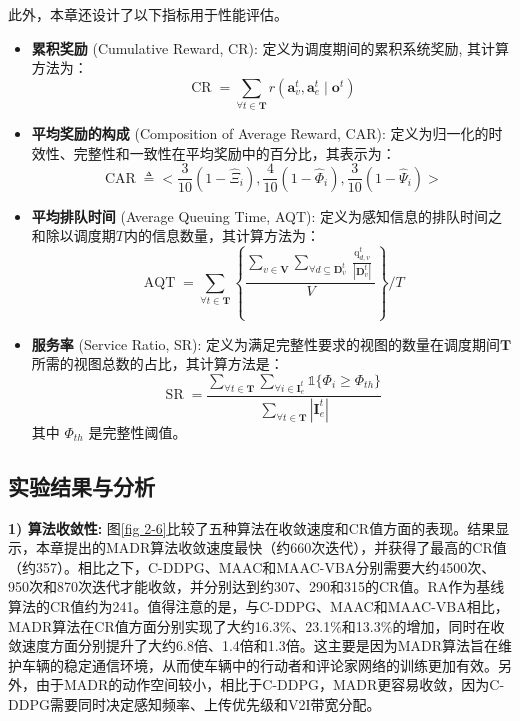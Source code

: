 此外，本章还设计了以下指标用于性能评估。
\begin{itemize}
	\item \textbf{累积奖励} (Cumulative Reward, CR): 定义为调度期间的累积系统奖励, 其计算方法为：
		\begin{equation}
			\operatorname{CR} = \sum_{\forall t \in \mathbf{T}} r\left(\boldsymbol{a}_{v}^{t},\boldsymbol{a}_{e}^{t} \mid \boldsymbol{o}^{t}\right)
		\end{equation}
	\item \textbf{平均奖励的构成} (Composition of Average Reward, CAR): 定义为归一化的时效性、完整性和一致性在平均奖励中的百分比，其表示为：
		\begin{equation}
			\operatorname{CAR} \triangleq <\frac{3}{10}(1-\hat{\Xi}_{i}),\frac{4}{10}(1-\hat{\Phi}_{i}), \frac{3}{10}(1-\hat{\Psi}_{i})>
		\end{equation}
	\item \textbf{平均排队时间} (Average Queuing Time, AQT): 定义为感知信息的排队时间之和除以调度期$T$内的信息数量，其计算方法为：
		\begin{equation}
			\operatorname{AQT} =\sum_{\forall t \in \mathbf{T}} \left \{ \frac{\sum_{v \in \mathbf{V}} \sum_{\forall d \subseteq \mathbf{D}_{v}^t} \frac{\operatorname{q}_{d, v}^t}{|\mathbf{D}_{v}^t|} }{V} \right\} \bigg/ T
		\end{equation}
	\item \textbf{服务率} (Service Ratio, SR): 定义为满足完整性要求的视图的数量在调度期间$\mathbf{T}$所需的视图总数的占比，其计算方法是：
		\begin{equation}
			\operatorname{SR} = \frac{\sum_{\forall t \in \mathbf{T}}\sum_{\forall i \in \mathbf{I}_e^t} \mathds{1}\{\Phi_{i} \geq \Phi_{th}\}}{ \sum_{\forall t \in \mathbf{T}} |\mathbf{I}_e^t|}
		\end{equation}
	其中 $\Phi_{th}$ 是完整性阈值。
\end{itemize}

\subsection{实验结果与分析}

\textbf{1) 算法收敛性:}
图\ref{fig 2-6}比较了五种算法在收敛速度和CR值方面的表现。结果显示，本章提出的MADR算法收敛速度最快（约660次迭代），并获得了最高的CR值（约357）。相比之下，C-DDPG、MAAC和MAAC-VBA分别需要大约4500次、950次和870次迭代才能收敛，并分别达到约307、290和315的CR值。RA作为基线算法的CR值约为241。值得注意的是，与C-DDPG、MAAC和MAAC-VBA相比，MADR算法在CR值方面分别实现了大约16.3\%、23.1\%和13.3\%的增加，同时在收敛速度方面分别提升了大约6.8倍、1.4倍和1.3倍。这主要是因为MADR算法旨在维护车辆的稳定通信环境，从而使车辆中的行动者和评论家网络的训练更加有效。另外，由于MADR的动作空间较小，相比于C-DDPG，MADR更容易收敛，因为C-DDPG需要同时决定感知频率、上传优先级和V2I带宽分配。


